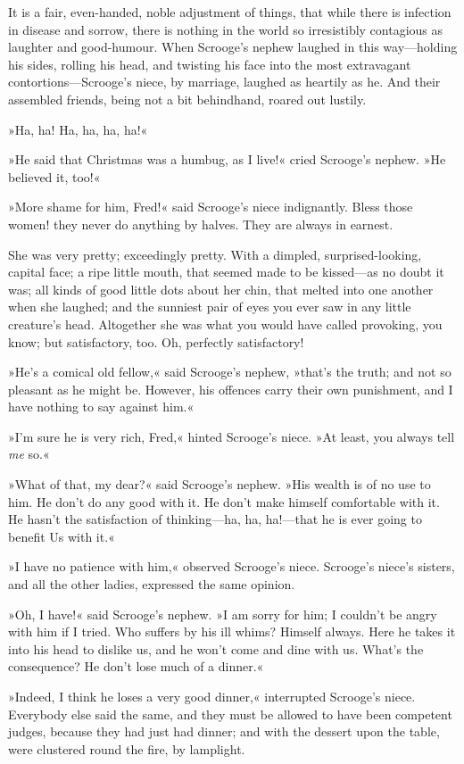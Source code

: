 It is a fair, even-handed, noble adjustment of things, that while there is infection in disease and sorrow, there is nothing in the world so irresistibly contagious as laughter and good-humour.  When Scrooge's nephew laughed in this way---holding his sides, rolling his head, and twisting his face into the most extravagant  contortions---Scrooge's niece, by marriage, laughed as heartily as he. And their assembled friends, being not a bit behindhand, roared out lustily.

»Ha, ha! Ha, ha, ha, ha!«

»He said that Christmas was a humbug, as I live!« cried Scrooge's nephew. »He believed it, too!«

»More shame for him, Fred!« said Scrooge's niece indignantly. Bless those women! they never do anything by halves. They are always in earnest.

She was very pretty; exceedingly pretty. With a dimpled,  surprised-looking, capital face; a ripe little mouth, that seemed made to be kissed---as no doubt it was; all kinds of good little dots about her chin, that melted into one another when she laughed; and the sunniest pair of eyes you ever saw in any little creature's head. Altogether she was what you would have called provoking, you know; but satisfactory, too. Oh, perfectly satisfactory!

»He's a comical old fellow,« said Scrooge's nephew, »that's the truth; and not so pleasant as he might be. However, his offences carry their own punishment, and I have nothing to say against him.«

»I'm sure he is very rich, Fred,« hinted Scrooge's niece. »At least, you always tell \textit{me} so.«

»What of that, my dear?« said Scrooge's nephew. »His wealth is of no use to him. He don't do any good with it. He don't make himself comfortable with it. He hasn't the satisfaction of thinking---ha, ha, ha!---that he is ever going to benefit Us with it.«

»I have no patience with him,« observed Scrooge's niece.  Scrooge's niece's sisters, and all the other ladies, expressed the same opinion.

»Oh, I have!« said Scrooge's nephew. »I am sorry for him; I couldn't be angry with him if I tried. Who suffers by his ill whims? Himself always. Here he takes it into his head to dislike us, and he won't come and dine with us. What's the consequence? He don't lose much of a dinner.«

»Indeed, I think he loses a very good dinner,« interrupted  Scrooge's niece. Everybody else said the same, and they must be allowed to have been competent judges, because they had just had dinner; and with the dessert upon the table, were clustered round the fire, by lamplight.

